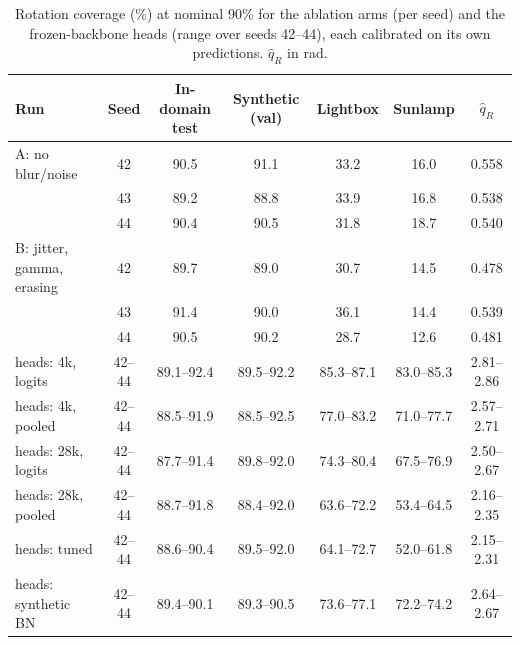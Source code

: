 \begin{table}[ht]
  \caption{Rotation coverage (\%) at nominal 90\% for the ablation arms (per seed) and the frozen-backbone heads (range over seeds 42--44), each calibrated on its own predictions. $\hat{q}_R$ in rad.}
  \label{tab:conformal-revision}
  \centering
  \scriptsize
  \setlength{\tabcolsep}{4pt}
  \begin{tabular}{l c cccc c}
    \toprule
    Run & Seed & In-domain test & Synthetic (val) & Lightbox & Sunlamp & $\hat{q}_R$ \\
    \midrule
    A: no blur/noise & 42 & 90.5 & 91.1 & 33.2 & 16.0 & 0.558 \\
     & 43 & 89.2 & 88.8 & 33.9 & 16.8 & 0.538 \\
     & 44 & 90.4 & 90.5 & 31.8 & 18.7 & 0.540 \\
    \midrule
    B: jitter, gamma, erasing & 42 & 89.7 & 89.0 & 30.7 & 14.5 & 0.478 \\
     & 43 & 91.4 & 90.0 & 36.1 & 14.4 & 0.539 \\
     & 44 & 90.5 & 90.2 & 28.7 & 12.6 & 0.481 \\
    \midrule
    heads: 4k, logits & 42--44 & 89.1--92.4 & 89.5--92.2 & 85.3--87.1 & 83.0--85.3 & 2.81--2.86 \\
    heads: 4k, pooled & 42--44 & 88.5--91.9 & 88.5--92.5 & 77.0--83.2 & 71.0--77.7 & 2.57--2.71 \\
    heads: 28k, logits & 42--44 & 87.7--91.4 & 89.8--92.0 & 74.3--80.4 & 67.5--76.9 & 2.50--2.67 \\
    heads: 28k, pooled & 42--44 & 88.7--91.8 & 88.4--92.0 & 63.6--72.2 & 53.4--64.5 & 2.16--2.35 \\
    heads: tuned & 42--44 & 88.6--90.4 & 89.5--92.0 & 64.1--72.7 & 52.0--61.8 & 2.15--2.31 \\
    heads: synthetic BN & 42--44 & 89.4--90.1 & 89.3--90.5 & 73.6--77.1 & 72.2--74.2 & 2.64--2.67 \\
    \bottomrule
  \end{tabular}
\end{table}
